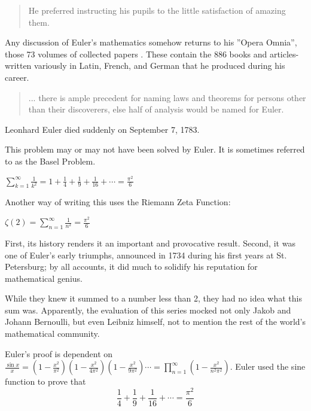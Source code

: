 \documentclass[12pt]{article}
\begin{document}
\vspace{-5mm}
\begin{quote}
He preferred instructing his pupils to the little satisfaction of    
amazing them.
\end{quote}
\vspace{-5mm}
\begin{doublespace}

Any discussion of Euler's mathematics somehow returns to his ''Opera Omnia'', those 73 volumes of collected papers . These contain the 886 books and articles-written variously in Latin, French, and German­ that he produced during his career.

\end{doublespace}
\vspace{-5mm}
\begin{quote}
... there is ample precedent for naming laws and theorems for persons    
other than their discoverers, else half of analysis would be named for Euler.
\end{quote}
\vspace{-5mm}
\begin{doublespace}

Leonhard Euler died suddenly on September 7, 1783.



This problem may or may not have been solved by Euler. It is sometimes referred to as the Basel Problem. 

$\displaystyle \sum\limits_{k=1}^\infty \frac{1}{k^2}=1+\frac{1}{4}+\frac{1}{9}+\frac{1}{16}+\cdots=\frac{\pi^2}{6}$

Another way of writing this uses the Riemann Zeta Function:

$\displaystyle \zeta \left({2}\right) = \sum_{n \mathop = 1}^{\infty} {\frac 1 {n^2}} = \frac {\pi^2} 6$

First, its history renders it an important and provocative result. Second, it was one of Euler's early triumphs, announced in 1734 during his first years at St. Petersburg; by all accounts, it did much to solidify his reputation for mathematical genius.

While they knew it summed to a number less than 2, they had no idea what this sum was.      
Apparently, the evaluation of this series mocked not only Jakob and Johann Bernoulli, but even Leibniz himself, not to mention the rest of the world's mathematical community.

Euler's proof is dependent on   
$\displaystyle \frac{\sin x}x = \left({1 - \frac{x^2}{\pi^2}}\right) \left({1 - \frac{x^2}{4 \pi^2}}\right) \left({1 - \frac{x^2}{9 \pi^2}}\right) \cdots = \prod_{n = 1}^\infty \left({1 - \frac{x^2}{n^2 \pi^2}}\right)$.
Euler used the sine function to prove that        
\[\frac{1}{4}+\frac{1}{9}+\frac{1}{16}+\cdots=\frac{\pi^2}{6}\]

\end{doublespace}
\end{document}
